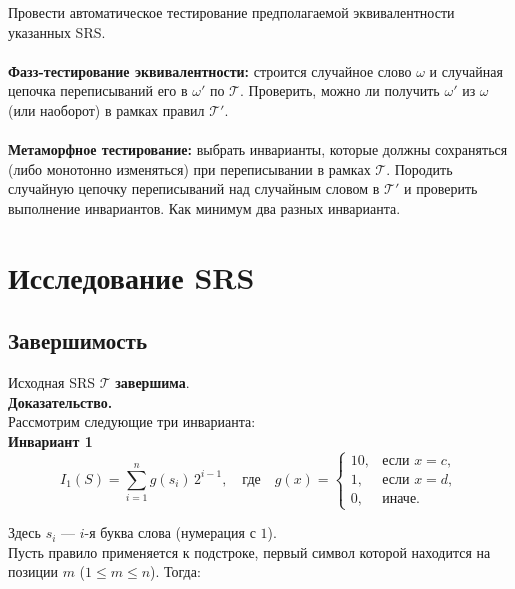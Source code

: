 \documentclass[a4paper,12pt]{article}
\newcommand{\T}{\mathcal{T}}
\newcommand{\w}{\omega}
\begin{document}
Провести автоматическое тестирование предполагаемой эквивалентности указанных SRS.\\\\
\textbf{Фазз-тестирование эквивалентности:} строится случайное слово $\w$ и 
случайная цепочка переписываний его в $\w'$ по $\T$. Проверить, можно ли 
получить $\w'$ из $\w$ (или наоборот) в рамках правил $\T'$.\\\\
\textbf{Метаморфное тестирование:} выбрать инварианты, которые должны сохраняться
(либо монотонно изменяться) при переписывании в рамках $\T$. Породить случайную 
цепочку переписываний над случайным словом в $\T'$ и проверить выполнение 
инвариантов. Как минимум два разных инварианта.

\clearpage 
\section{Исследование SRS}


\subsection{Завершимость}

Исходная SRS $\mathcal{T}$ \textbf{завершима}. \\

\noindent\textbf{Доказательство.} \\

Рассмотрим следующие три инварианта: \\

\textbf{Инвариант 1}
\[
I_1(S) = \sum_{i=1}^{n} g(s_i)\, 2^{i-1},
\quad \text{где} \quad
g(x) = 
\begin{cases}
10, & \text{если } x = c,\\
1, & \text{если } x = d,\\
0, & \text{иначе.}
\end{cases}
\]

Здесь $s_i$ — $i$-я буква слова (нумерация с $1$). \\

Пусть правило применяется к подстроке, первый символ которой находится на позиции $m$ ($1 \le m \le n$). Тогда:
\end{document}
